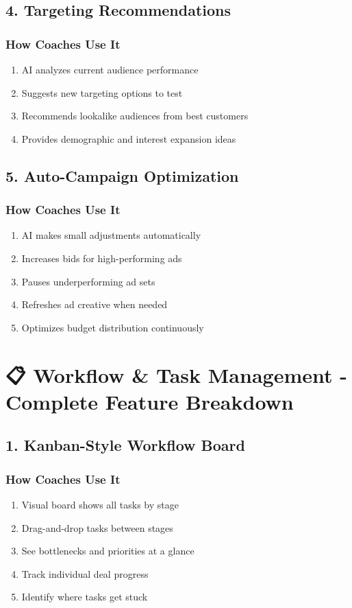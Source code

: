\documentclass[12pt,a4paper]{article}
\begin{document}
\subsection{4. Targeting Recommendations}

\subsubsection{How Coaches Use It}
\begin{enumerate}
    \item AI analyzes current audience performance
    \item Suggests new targeting options to test
    \item Recommends lookalike audiences from best customers
    \item Provides demographic and interest expansion ideas
\end{enumerate}

\subsection{5. Auto-Campaign Optimization}

\subsubsection{How Coaches Use It}
\begin{enumerate}
    \item AI makes small adjustments automatically
    \item Increases bids for high-performing ads
    \item Pauses underperforming ad sets
    \item Refreshes ad creative when needed
    \item Optimizes budget distribution continuously
\end{enumerate}

\section{📋 Workflow \& Task Management - Complete Feature Breakdown}

\subsection{1. Kanban-Style Workflow Board}

\subsubsection{How Coaches Use It}
\begin{enumerate}
    \item Visual board shows all tasks by stage
    \item Drag-and-drop tasks between stages
    \item See bottlenecks and priorities at a glance
    \item Track individual deal progress
    \item Identify where tasks get stuck
\end{enumerate}
\end{document}
